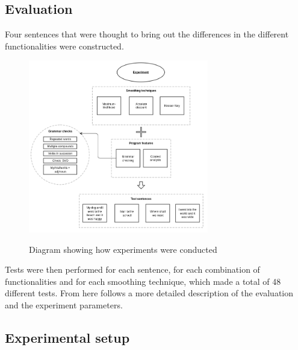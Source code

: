 \subsection{Evaluation}
Four sentences that were thought to bring out the differences in the different functionalities were constructed. 
\begin{figure}[h]
\center
\includegraphics[width=0.7\textwidth]{img/experiment_diagram.png}
\label{fig:experiments}
\caption{Diagram showing how experiments were conducted}
\end{figure}
Tests were then performed for each sentence, for each combination of functionalities and for each smoothing technique, which made a total of 48 different tests. From here follows a more detailed description of the evaluation and the experiment parameters.
\subsection{Experimental setup}
\lipsum[1]